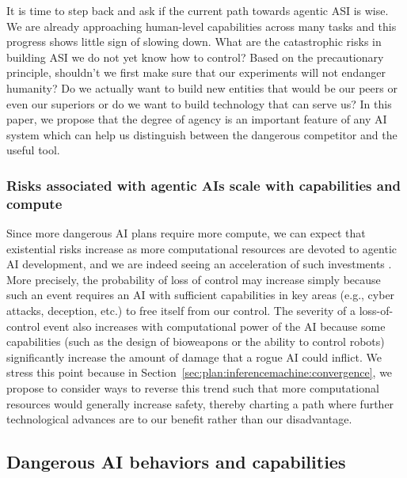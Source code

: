 It is time to step back and ask if the current path towards agentic ASI is wise. We are already approaching human-level capabilities across many tasks \cite{aiindex.stanford.edu.wp.content.uploads.2024.04.HAI.2024.AI.Index.Report.pdf,arxiv.org.abs.2410.07391} and this progress shows little sign of slowing down. What are the catastrophic risks in building ASI we do not yet know how to control? Based on the precautionary principle, shouldn't we first make sure that our experiments will not endanger humanity? Do we actually want to build new entities that would be our peers or even our superiors or do we want to build technology that can serve us? In this paper, we propose that the degree of agency is an important feature of any AI system which can help us distinguish between the dangerous competitor and the useful tool.

    \subsubsection{Risks associated with agentic AIs scale with capabilities and compute}
    \label{sec:existential:riskseverity:scaling}

Since more dangerous AI plans require more compute, we can expect that existential risks increase as more computational resources are devoted to agentic AI development, and we are indeed seeing an acceleration of such investments \cite{epoch.ai.trendsinvestment,openai.com.index.announcing.the.stargate.project}. More precisely, the probability of loss of control may increase simply because such an event requires an AI with sufficient capabilities in key areas (e.g., cyber attacks, deception, etc.) to free itself from our control. The severity of a loss-of-control event also increases with computational power of the AI because some capabilities (such as the design of bioweapons or the ability to control robots) significantly increase the amount of damage that a rogue AI could inflict. We stress this point because in Section~\ref{sec:plan:inferencemachine:convergence}, we propose to consider ways to reverse this trend such that more computational resources would generally increase safety, thereby charting a path where further technological advances are to our benefit rather than our disadvantage.    
  
\subsection{Dangerous AI behaviors and capabilities}
\label{sec:existential:lossofcontrol}

